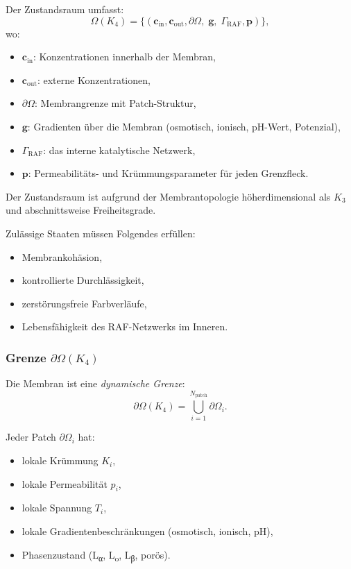 Der Zustandsraum umfasst:
\[
\Omega(K_4) =
\{(\mathbf{c}_{\mathrm{in}},\mathbf{c}_{\mathrm{out}},
  \partial\Omega,\; \mathbf{g},\; \Gamma_{\mathrm{RAF}},
  \mathbf{p})\},
\]
wo:
\begin{itemize}
    \item $\mathbf{c}_{\mathrm{in}}$: Konzentrationen innerhalb der Membran,
    \item $\mathbf{c}_{\mathrm{out}}$: externe Konzentrationen,
    \item $\partial\Omega$: Membrangrenze mit Patch-Struktur,
    \item $\mathbf{g}$: Gradienten über die Membran (osmotisch, ionisch,
          pH-Wert, Potenzial),
    \item $\Gamma_{\mathrm{RAF}}$: das interne katalytische Netzwerk,
    \item $\mathbf{p}$: Permeabilitäts- und Krümmungsparameter für jeden
          Grenzfleck.
\end{itemize}

Der Zustandsraum ist aufgrund der Membrantopologie höherdimensional als $K_3$
und abschnittsweise Freiheitsgrade.

Zulässige Staaten müssen Folgendes erfüllen:
\begin{itemize}
    \item Membrankohäsion,
    \item kontrollierte Durchlässigkeit,
    \item zerstörungsfreie Farbverläufe,
    \item Lebensfähigkeit des RAF-Netzwerks im Inneren.
\end{itemize}

\subsubsection{Grenze \texorpdfstring{$\partial\Omega(K_4)$}{\partial\Omega(K_4)}}

Die Membran ist eine \emph{dynamische Grenze}:
\[
\partial\Omega(K_4) = \bigcup_{i=1}^{N_{\mathrm{patch}}}
    \partial\Omega_i.
\]

Jeder Patch $\partial\Omega_i$ hat:
\begin{itemize}
    \item lokale Krümmung $K_i$,
    \item lokale Permeabilität $p_i$,
    \item lokale Spannung $T_i$,
    \item lokale Gradientenbeschränkungen (osmotisch, ionisch, pH),
    \item Phasenzustand (L\textsubscript{α}, L\textsubscript{o},
          L\textsubscript{β}, porös).
\end{itemize}

